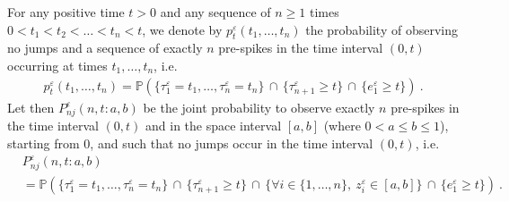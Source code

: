 \documentclass[reqno, 12pt, a4paper]{amsart}
\theoremstyle{plain}
\theoremstyle{definition}
\begin{document}
For any positive time $t>0$ and any sequence of $n \ge 1$ times $0<t_1< t_2< \ldots<t_n< t$, we denote by $p_t^\varepsilon (t_1,\ldots, t_n)$ the probability of observing no jumps and a sequence of exactly $n$ pre-spikes in the time interval $(0,t)$ occurring at times $t_1, \ldots,t_n$, i.e.
\begin{equation}
\begin{split}
p_t^\varepsilon (t_1,\ldots, t_n) = \mathbb P \left( \{ \tau_1^\varepsilon=t_1, \ldots, \tau_{n}^\varepsilon = t_n\}  \, \cap \,  \{\tau_{n+1}^\varepsilon \ge t\} \,  \cap \,  \{ e_1^\varepsilon \ge t\} \right) \ .
\end{split}
\end{equation}
Let then $P^\varepsilon_{nj}(n,t : a,b)$ be the joint probability  to observe exactly $n$ pre-spikes in the time interval $(0,t)$ and in the space interval $[a,b]$ (where $0<a\le b\le1$), starting from $0$, and such that no jumps occur in the time interval $(0,t)$, i.e.  
\begin{equation}
\begin{split}
&P^{\varepsilon}_{nj}(n,t : a,b) \\
&= \mathbb P \left( \{ \tau_1^\varepsilon=t_1, \ldots, \tau_{n}^\varepsilon = t_n\}  \, \cap \,  \{\tau_{n+1}^\varepsilon \ge t\} \, \cap \, \{ \forall i \in \{1,\ldots,n\}, \ z_{i}^\varepsilon \in [a,b] \} \,  \cap \,  \{ e_1^\varepsilon \ge t\} \right) \ . 
\end{split}
\end{equation}
\end{document}
